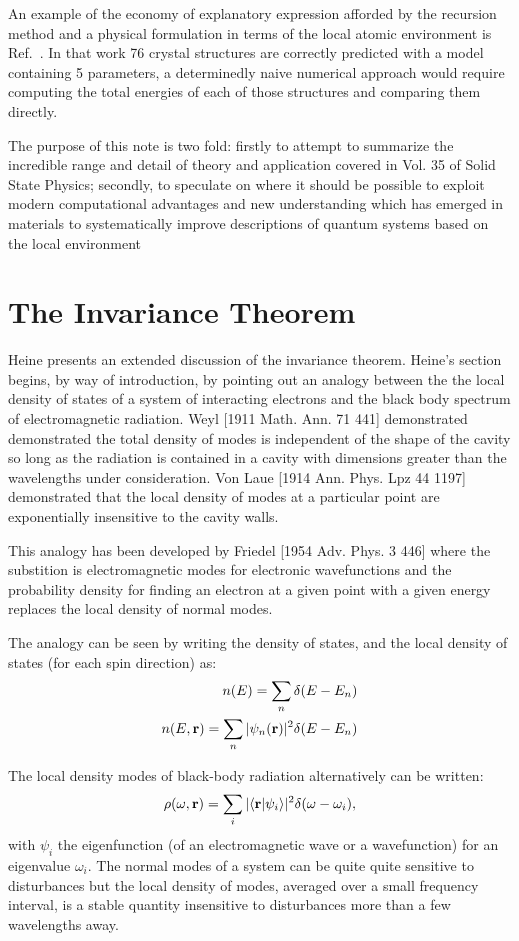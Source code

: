 \documentclass{article}
\def\ket{\rangle}
\def\bra{\langle}
\def\r{{\bf r}}
\begin{document}
An example of the economy of explanatory expression afforded by the recursion method
and a physical formulation in terms of the local atomic environment
is Ref.~\cite{johannes76}. In that work 76 crystal structures are correctly predicted 
with a model containing 5 parameters, a determinedly naive numerical approach would
require computing the total energies of each of those structures and comparing them directly. 

The purpose of this note is two fold: firstly to attempt to summarize the incredible range and
detail of theory and application covered in Vol. 35 of Solid State Physics; secondly, to speculate on where 
it should be possible to exploit modern computational advantages and new understanding 
which has emerged in materials to systematically improve descriptions of quantum systems based
on the local environment 


\section{The Invariance Theorem}
\label{sec:invariance}
Heine presents an extended discussion of the invariance
theorem. Heine's section begins, by way of introduction, by pointing 
out an analogy between the the local density of states of a system of interacting
electrons and the black body spectrum of electromagnetic radiation.
Weyl [1911 Math. Ann. 71 441] demonstrated demonstrated the total density
of modes is independent of the shape of the cavity so long as the
radiation is contained in a cavity with dimensions greater than the wavelengths
under consideration. Von Laue [1914 Ann. Phys. Lpz 44 1197] demonstrated that the local density of modes at 
a particular point are exponentially insensitive to the cavity walls.

This analogy has been developed by Friedel [1954 Adv. Phys. 3 446] where
the substition is electromagnetic modes for electronic wavefunctions and
the probability density for finding an electron at a given point
with a given energy replaces the local density of normal modes.\cite{annett94}

The analogy can be seen by writing the density of states,
and the local density of states (for each spin direction) as:
%
\begin{eqnarray}
n(E) = \sum_{n}\delta(E-E_{n}) \\
n(E,\r) = \sum_{n} |\psi_{n}(\r)|^{2}\delta(E-E_{n})
\end{eqnarray}
%

The local density modes of black-body radiation alternatively can be written:
%
\begin{equation}
\rho(\omega,\r)= \sum_{i} |\bra \r| \psi_{i}\ket|^{2}\delta(\omega-\omega_{i}),
\end{equation}
%
with $\psi_{i}$ the eigenfunction (of an electromagnetic wave or a wavefunction) for an eigenvalue $\omega_{i}$.\cite{annett94}
The normal modes of a system can be quite quite sensitive to disturbances but the 
local density of modes, averaged over a small frequency interval, is a stable quantity 
insensitive to disturbances more than a few wavelengths away.
\end{document}
